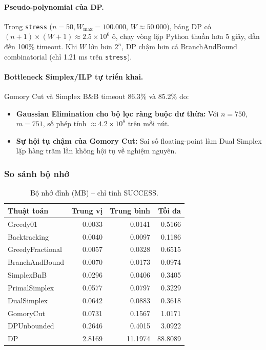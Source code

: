 \paragraph{Pseudo-polynomial của DP.} Trong \texttt{stress} ($n=50, W_{\text{max}}=100.000$, $W\approx 50.000$), bảng DP có $(n+1)\times(W+1)\approx 2.5\times 10^6$ ô, chạy vòng lặp Python thuần hơn 5 giây, dẫn đến 100\% timeout. Khi $W$ lớn hơn $2^n$, DP chậm hơn cả BranchAndBound combinatorial (chỉ 1.21 ms trên \texttt{stress}).

\paragraph{Bottleneck Simplex/ILP tự triển khai.} Gomory Cut và Simplex B\&B timeout 86.3\% và 85.2\% do:
\begin{itemize}[leftmargin=*]
    \item \textbf{Gaussian Elimination cho bộ lọc ràng buộc dư thừa:} Với $n=750$, $m=751$, số phép tính $\approx 4.2\times 10^8$ trên mỗi nút.
    \item \textbf{Sự hội tụ chậm của Gomory Cut:} Sai số floating-point làm Dual Simplex lặp hàng trăm lần không hội tụ về nghiệm nguyên.
\end{itemize}

\FloatBarrier
\subsubsection{So sánh bộ nhớ}

\begin{table}[H]
\centering
\caption{Bộ nhớ đỉnh (MB) -- chỉ tính SUCCESS.}
\label{tab:memory_results}
\begin{tabular}{lrrr}
\toprule
\textbf{Thuật toán} & \textbf{Trung vị} & \textbf{Trung bình} & \textbf{Tối đa} \\
\midrule
Greedy01         & 0.0033 & 0.0141 & 0.5166 \\
Backtracking     & 0.0040 & 0.0097 & 0.1186 \\
GreedyFractional & 0.0057 & 0.0328 & 0.6515 \\
BranchAndBound   & 0.0070 & 0.0173 & 0.0974 \\
SimplexBnB       & 0.0296 & 0.0406 & 0.3405 \\
PrimalSimplex    & 0.0577 & 0.0797 & 0.3229 \\
DualSimplex      & 0.0642 & 0.0883 & 0.3618 \\
GomoryCut        & 0.0731 & 0.1567 & 1.0171 \\
DPUnbounded      & 0.2646 & 0.4015 & 3.0922 \\
DP               & 2.8169 & 11.1974 & 88.8089 \\
\bottomrule
\end{tabular}
\end{table}

